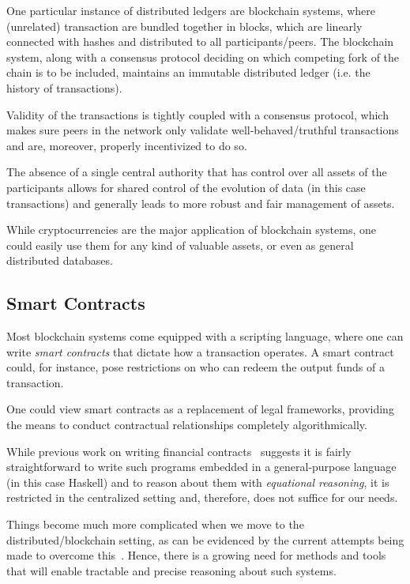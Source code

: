 \documentclass[acmsmall,nonacm=true,screen=true]{acmart}
\begin{document}
One particular instance of distributed ledgers are blockchain systems, where (unrelated) transaction are
bundled together in blocks, which are linearly connected with hashes and distributed to all participants/peers.
The blockchain system, along with a consensus protocol deciding on which competing fork of the chain is to be included,
maintains an immutable distributed ledger (i.e. the history of transactions).

Validity of the transactions is tightly coupled with a consensus protocol, which makes sure
peers in the network only validate well-behaved/truthful transactions and are, moreover,
properly incentivized to do so.

The absence of a single central authority that has control over all assets of the participants allows
for shared control of the evolution of data (in this case transactions)
and generally leads to more robust and fair management of assets.

While cryptocurrencies are the major application of blockchain systems, one could easily
use them for any kind of valuable assets, or even as general distributed databases.

\subsection{Smart Contracts} \label{subsec:smartcontracts}
Most blockchain systems come equipped with a scripting language, where one can write
\textit{smart contracts} that dictate how a transaction operates. A smart contract
could, for instance, pose restrictions on who can redeem the output funds of a transaction.

One could view smart contracts as a replacement of legal frameworks, providing the means
to conduct contractual relationships completely algorithmically.

While previous work on writing financial contracts~\cite{spj} suggests it
is fairly straightforward to write such programs embedded in a general-purpose
language (in this case Haskell) and to reason about them with \textit{equational reasoning},
it is restricted in the centralized setting and, therefore, does not suffice for our needs.

Things become much more complicated when we move to the distributed/blockchain setting, as
can be evidenced by the current attempts being made to overcome this~\cite{setzer,short,scilla}.
Hence, there is a growing need for methods and tools that will
enable tractable and precise reasoning about such systems.
\end{document}
